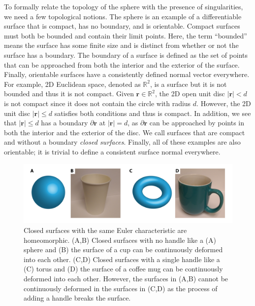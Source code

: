 To formally relate the topology of the sphere with the presence of singularities, we need a few topological notions.
The sphere is an example of a differentiable surface that is compact, has no boundary, and is orientable.
Compact surfaces must both be bounded and contain their limit points.
Here, the term ``bounded'' means the surface has some finite size and is distinct from whether or not the surface has a boundary.
The boundary of a surface is defined as the set of points that can be approached from both the interior and the exterior of the surface.
Finally, orientable surfaces have a consistently defined normal vector everywhere.
For example, 2D Euclidean space, denoted as $\mathbb{R}^2$, is a surface but it is not bounded and thus it is not compact.
Given $\mathbf{r} \in \mathbb{R}^2$, the 2D open unit disc $|\mathbf{r}| < d$ is not compact since it does not contain the circle with radius $d$.
However, the 2D unit disc $|\mathbf{r}| \leq d$ satisfies both conditions and thus is compact.
In addition, we see that $|\mathbf{r}| \leq d$ has a boundary $\partial \mathbf{r}$ at $|\mathbf{r}| = d$, as $\partial \mathbf{r}$ can be approached by points in both the interior and the exterior of the disc.
We call surfaces that are compact and without a boundary \emph{closed surfaces}.
Finally, all of these examples are also orientable; it is trivial to define a consistent surface normal everywhere.
\begin{figure}
  \centering
  \includegraphics{figures/C1/Ch1-Figs_ChiObjects.png}
  \caption{Closed surfaces with the same Euler characteristic are homeomorphic. (A,B) Closed surfaces with no handle like a (A) sphere and (B) the surface of a cup can be continuously deformed into each other.
  (C,D) Closed surfaces with a single handle like a (C) torus and (D) the surface of a coffee mug can be continuously deformed into each other.
  However, the surfaces in (A,B) cannot be continuously deformed in the surfaces in (C,D) as the process of adding a handle breaks the surface.}\label{f:1-ChiObjects}
\end{figure}

